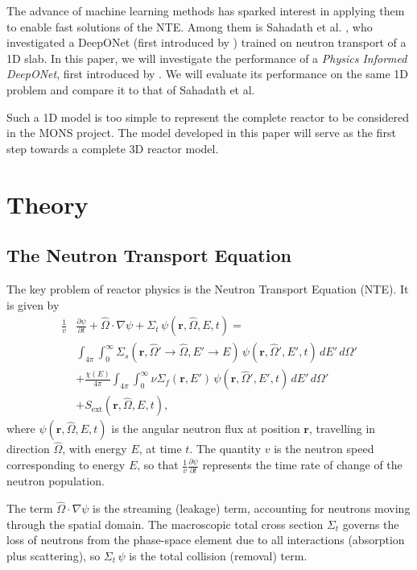 \documentclass[%
 reprint,
 amsmath,amssymb,
 aps,
]{revtex4-1}
\begin{document}
The advance of machine learning methods has sparked interest in applying them to enable fast solutions of the NTE. Among them is Sahadath et al.
\cite{sahadath2026characterization}, who investigated a DeepONet (first introduced by \cite{deeponet}) trained on neutron transport of a 1D slab. In this paper, we will investigate
the performance of a \textit{Physics Informed DeepONet}, first introduced by \cite{wang2021learning}. We will evaluate its performance on the same
1D problem and compare it to that of Sahadath et al.

Such a 1D model is too simple to represent the complete reactor to be considered in the MONS project. The model developed in this paper will
serve as the first step towards a complete 3D reactor model.

\section{Theory}

\subsection{The Neutron Transport Equation}

The key problem of reactor physics is the Neutron Transport Equation (NTE). It is given by
\begin{align}
\frac{1}{v} &\frac{\partial \psi}{\partial t} + \hat{\Omega}\cdot\nabla\psi + \Sigma_t\,\psi(\mathbf{r},\hat{\Omega},E,t) = \nonumber \\
     &\int_{4\pi}\int_0^\infty \Sigma_s(\mathbf{r},\hat{\Omega}'\to\hat{\Omega},E'\to E)\,\psi(\mathbf{r},\hat{\Omega}',E',t)\,dE'\,d\Omega' \\ \nonumber
     &+ \frac{\chi(E)}{4\pi}\int_{4\pi}\int_0^\infty \nu\Sigma_f(\mathbf{r},E')\,\psi(\mathbf{r},\hat{\Omega}',E',t)\,dE'\,d\Omega' \\ \nonumber
     &+ S_{\text{ext}}(\mathbf{r},\hat{\Omega},E,t),
\end{align}
where $\psi(\mathbf{r},\hat{\Omega},E,t)$ is the angular neutron flux at position $\mathbf{r}$, travelling in direction $\hat{\Omega}$, with
energy $E$, at time $t$. The quantity $v$ is the neutron speed corresponding to energy $E$, so that
$\tfrac{1}{v}\tfrac{\partial \psi}{\partial t}$ represents the time rate of change of the neutron population.

The term $\hat{\Omega}\cdot\nabla\psi$ is the streaming (leakage) term, accounting for neutrons moving through the spatial domain.
The macroscopic total cross section $\Sigma_t$ governs the loss of neutrons from the phase-space element due to all interactions
(absorption plus scattering), so $\Sigma_t\,\psi$ is the total collision (removal) term.
\end{document}
